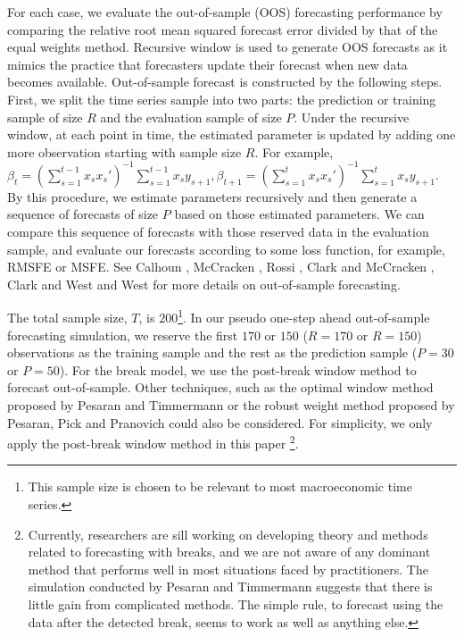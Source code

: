For each case, we evaluate the out-of-sample (OOS) forecasting performance by comparing the relative root mean squared forecast error divided by that of the equal weights method. Recursive window is used to generate OOS forecasts as it mimics the practice that forecasters update their forecast when new data becomes available. Out-of-sample forecast is constructed by the following steps. First, we split the time series sample into two parts: the prediction or training sample of size $R$ and the evaluation sample of size $P$. Under the recursive window, at each point in time, the estimated parameter is updated by adding one more observation starting with sample size $R$. For example, $\beta_{t} = (\sum_{s=1}^{t-1} x_{s} x_{s}')^{-1}\sum_{s=1}^{t-1}x_{s}y_{s+1},\beta_{t+1} = (\sum_{s=1}^{t} x_{s} x_{s}')^{-1}\sum_{s=1}^{t}x_{s}y_{s+1}$. By this procedure, we estimate parameters recursively and then generate a sequence of forecasts of size $P$ based on those estimated parameters. We can compare this sequence of forecasts with those reserved data in the evaluation sample, and evaluate our forecasts according to some loss function, for example, RMSFE or MSFE. See Calhoun \cite{calhoun_bootstrap_2013} \cite{calhoun_overfit_2014}, McCracken \cite{mccracken_JE2000} \cite{mccracken_JE2007}, Rossi \cite{rossi_HANDBOOK2013}, Clark and McCracken \cite{clark_mccracken_JE2001} \cite{clark_mccracken_JE2005} \cite{clark_mccracken_HANDBOOK2013}, Clark and West \cite{clark_west_JE2007} and West \cite{west_HANDBOOK2006} for more details on out-of-sample forecasting.

The total sample size, $T$, is $200$\footnote{This sample size is chosen to be relevant to most macroeconomic time series.}. In our pseudo one-step ahead out-of-sample forecasting simulation, we reserve the first $170$ or $150$ ($R = 170$ or $R = 150$) observations as the training sample and the rest as the prediction sample ($P = 30$ or $P = 50$). For the break model, we use the post-break window method to forecast out-of-sample. Other techniques, such as the optimal window method proposed by Pesaran and Timmermann \cite{pesaran_timmermann_JE2007} or the robust weight method proposed by Pesaran, Pick and Pranovich \cite{pesaran_pick_pranovich_2011} could also be considered. For simplicity, we only apply the post-break window method in this paper \footnote{Currently, researchers are sill working on developing theory and methods related to forecasting with breaks, and we are not aware of any dominant method that performs well in most situations faced by practitioners. The simulation conducted by Pesaran and Timmermann suggests that there is little gain from complicated methods. The simple rule, to forecast using the data after the detected break, seems to work as well as anything else.}.

